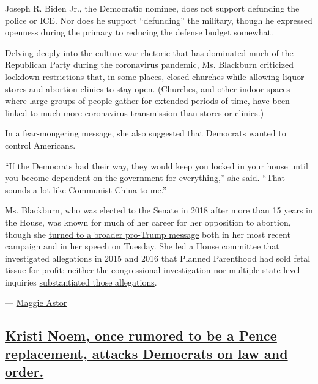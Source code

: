 Joseph R. Biden Jr., the Democratic nominee, does not support defunding
the police or ICE. Nor does he support ``defunding'' the military,
though he expressed openness during the primary to reducing the defense
budget somewhat.

Delving deeply into
\href{https://www.nytimes3xbfgragh.onion/2020/04/20/us/politics/coronavirus-protests-democrats-republicans.html}{the
culture-war rhetoric} that has dominated much of the Republican Party
during the coronavirus pandemic, Ms. Blackburn criticized lockdown
restrictions that, in some places, closed churches while allowing liquor
stores and abortion clinics to stay open. (Churches, and other indoor
spaces where large groups of people gather for extended periods of time,
have been linked to much more coronavirus transmission than stores or
clinics.)

In a fear-mongering message, she also suggested that Democrats wanted to
control Americans.

``If the Democrats had their way, they would keep you locked in your
house until you become dependent on the government for everything,'' she
said. ``That sounds a lot like Communist China to me.''

Ms. Blackburn, who was elected to the Senate in 2018 after more than 15
years in the House, was known for much of her career for her opposition
to abortion, though she
\href{https://www.nytimes3xbfgragh.onion/2018/09/09/us/politics/blackburn-abortion-tennessee-senate.html}{turned
to a broader pro-Trump message} both in her most recent campaign and in
her speech on Tuesday. She led a House committee that investigated
allegations in 2015 and 2016 that Planned Parenthood had sold fetal
tissue for profit; neither the congressional investigation nor multiple
state-level inquiries
\href{https://www.nytimes3xbfgragh.onion/2019/11/15/us/planned-parenthood-lawsuit-secret-videos.html}{substantiated
those allegations}.

--- \href{https://www.nytimes3xbfgragh.onion/by/maggie-astor}{Maggie
Astor}

\hypertarget{kristi-noem-once-rumored-to-be-a-pence-replacement-attacks-democrats-on-law-and-order}{%
\subsection{\texorpdfstring{\protect\hyperlink{kristi-noem-once-rumored-to-be-a-pence-replacement-attacks-democrats-on-law-and-order}{Kristi
Noem, once rumored to be a Pence replacement, attacks Democrats on law
and
order.}}{Kristi Noem, once rumored to be a Pence replacement, attacks Democrats on law and order.}}\label{kristi-noem-once-rumored-to-be-a-pence-replacement-attacks-democrats-on-law-and-order}}

